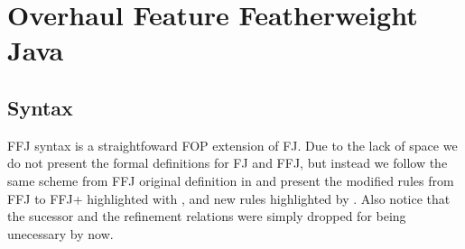 \section{Overhaul Feature Featherweight Java}\label{seq:ffj}

\subsection{Syntax}
\ac{FFJ} syntax is a straightfoward \ac{FOP} extension of \ac{FJ}. Due to the lack
of space we do not present the formal definitions for \ac{FJ} and \ac{FFJ}, but instead we follow
the same scheme from \ac{FFJ} original definition in \cite{apel_feature_2008} and present
the modified rules from \ac{FFJ} to \ac{FFJ+} highlighted with , 
and new rules highlighted by . Also notice that the sucessor and 
the refinement relations were simply dropped for being unecessary by now.

\newcommand{\cdecl}[6]{\texttt{class #1 extends #2 \{\={#3} \={#4}; #5 \={#6}\}}}
\newcommand{\crefine}[6]{\texttt{refines class #1 \{\={#2} \={#3}; #4 \={#5} \={#6}\}}}
\newcommand{\mdecl}[5]{\texttt{#1 #2 (\={#3} \={#4}) \{return #5;\}}}
\newcommand{\mrefine}[5]{\texttt{refines #1 #2 (\={#3} \={#4}) \{return #5;\}}}

